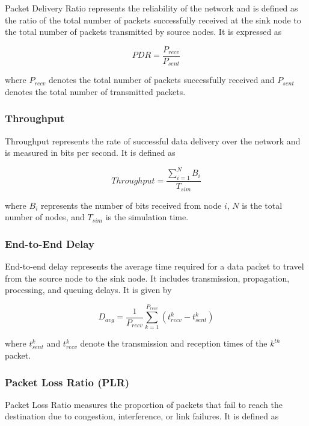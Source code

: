 \documentclass[a4paper,fleqn]{cas-dc}
\numberwithin{equation}{section}
\begin{document}
Packet Delivery Ratio represents the reliability of the network and is defined as the ratio of the total number of packets successfully received at the sink node to the total number of packets transmitted by source nodes. It is expressed as

\begin{equation}
PDR = \frac{P_{recv}}{P_{sent}}
\label{eq:pdr_metric}
\end{equation}

where $P_{recv}$ denotes the total number of packets successfully received and $P_{sent}$ denotes the total number of transmitted packets.

\subsubsection{Throughput}

Throughput represents the rate of successful data delivery over the network and is measured in bits per second. It is defined as

\begin{equation}
Throughput = \frac{\sum_{i=1}^{N} B_i}{T_{sim}}
\label{eq:throughput_metric}
\end{equation}

where $B_i$ represents the number of bits received from node $i$, $N$ is the total number of nodes, and $T_{sim}$ is the simulation time.

\subsubsection{End-to-End Delay}

End-to-end delay represents the average time required for a data packet to travel from the source node to the sink node. It includes transmission, propagation, processing, and queuing delays. It is given by

\begin{equation}
D_{avg} = \frac{1}{P_{recv}} \sum_{k=1}^{P_{recv}} (t_{recv}^k - t_{sent}^k)
\label{eq:delay_metric}
\end{equation}

where $t_{sent}^k$ and $t_{recv}^k$ denote the transmission and reception times of the $k^{th}$ packet.

\subsubsection{Packet Loss Ratio (PLR)}

Packet Loss Ratio measures the proportion of packets that fail to reach the destination due to congestion, interference, or link failures. It is defined as
\end{document}
